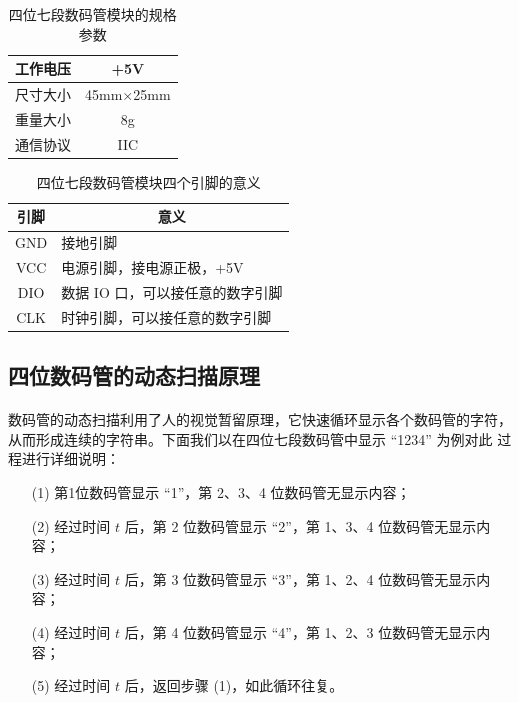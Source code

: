 \documentclass[UTF8, oneside]{ctexbook}
\begin{document}
\begin{table}[h]
    \centering
    \begin{tabular}{|c|c|}
    \hline
    工作电压 & +5V              \\ \hline
    尺寸大小 & 45mm$\times$25mm \\ \hline
    重量大小 & 8g               \\ \hline
    通信协议 & IIC              \\ \hline
    \end{tabular}
    \caption{四位七段数码管模块的规格参数}
    \label{47_para}
\end{table}

\begin{table}[h]
    \centering
    \begin{tabular}{|c|l|}
    \hline
    \textbf{引脚} & \multicolumn{1}{c|}{\textbf{意义}} \\ \hline
    GND         & 接地引脚                             \\ \hline
    VCC         & 电源引脚，接电源正极，+5V                   \\ \hline
    DIO         & 数据 IO 口，可以接任意的数字引脚               \\ \hline
    CLK         & 时钟引脚，可以接任意的数字引脚                  \\ \hline
    \end{tabular}
    \caption{四位七段数码管模块四个引脚的意义}
    \label{47_pin}
\end{table}

\subsection{四位数码管的动态扫描原理}
\paragraph{}
数码管的动态扫描利用了人的视觉暂留原理，它快速循环显示各个数码管的字符，
从而形成连续的字符串。下面我们以在四位七段数码管中显示 “1234” 为例对此
过程进行详细说明：
\begin{itemize}
    \item[(1)] 第1位数码管显示 “1”，第 2、3、4 位数码管无显示内容；
    \item[(2)] 经过时间 $t$ 后，第 2 位数码管显示 “2”，第 1、3、4 位数码管无显示内容；
    \item[(3)] 经过时间 $t$ 后，第 3 位数码管显示 “3”，第 1、2、4 位数码管无显示内容；
    \item[(4)] 经过时间 $t$ 后，第 4 位数码管显示 “4”，第 1、2、3 位数码管无显示内容；
    \item[(5)] 经过时间 $t$ 后，返回步骤 (1)，如此循环往复。 
\end{itemize}
\end{document}
